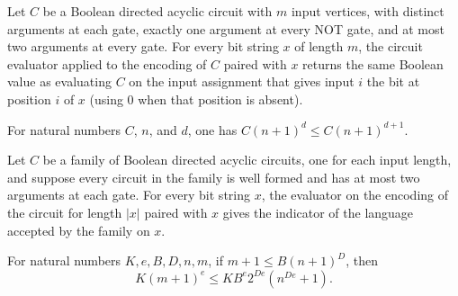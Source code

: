 \begin{lemma}
\label{Complexity.verdict_encode}
\leanok
{}
Let $C$ be a Boolean directed acyclic circuit with $m$ input vertices, with distinct
arguments at each gate, exactly one argument at every NOT gate, and at most two
arguments at every gate. For every bit string $x$ of length $m$, the circuit evaluator
applied to the encoding of $C$ paired with $x$ returns the same Boolean value as
evaluating $C$ on the input assignment that gives input $i$ the bit at position $i$ of
$x$ (using $0$ when that position is absent).
\end{lemma}

\begin{lemma}
\label{Complexity.mul_pow_le_mul_pow_succ}
\leanok
{}
For natural numbers $C$, $n$, and $d$, one has $C(n+1)^d \le C(n+1)^{d+1}$.
\end{lemma}

\begin{lemma}
\label{Complexity.verdict_encode_family}
\leanok
{}
Let $C$ be a family of Boolean directed acyclic circuits, one for each input length, and
suppose every circuit in the family is well formed and has at most two arguments at each
gate. For every bit string $x$, the evaluator on the encoding of the circuit for length
$|x|$ paired with $x$ gives the indicator of the language accepted by the family on $x$.
\end{lemma}

\begin{lemma}
\label{Complexity.time_le_of_length_le}
\leanok
{}
For natural numbers $K,e,B,D,n,m$, if $m+1\le B(n+1)^D$, then
\[
K(m+1)^e\le K B^e 2^{De}(n^{De}+1).
\]
\end{lemma}

